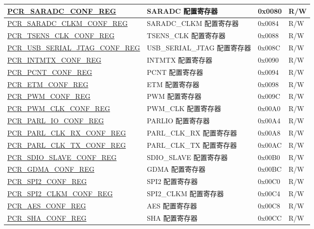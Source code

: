 \begin{longtable}{ | p{6cm} | p{7.2cm} | p{1.3cm} | p{1cm} | }
\hyperref[regdesc:PCRSARADCCONFREG]{PCR\_SARADC\_CONF\_REG} & SARADC 配置寄存器 & 0x0080 & R/W \\ \hline
\hyperref[regdesc:PCRSARADCCLKMCONFREG]{PCR\_SARADC\_CLKM\_CONF\_REG} & SARADC\_CLKM 配置寄存器 & 0x0084 & R/W \\ \hline
\hyperref[regdesc:PCRTSENSCLKCONFREG]{PCR\_TSENS\_CLK\_CONF\_REG} & TSENS\_CLK 配置寄存器 & 0x0088 & R/W \\ \hline
\hyperref[regdesc:PCRUSBDEVICECONFREG]{PCR\_USB\_SERIAL\_JTAG\_CONF\_REG} & USB\_SERIAL\_JTAG 配置寄存器 & 0x008C & R/W \\ \hline
\hyperref[regdesc:PCRINTMTXCONFREG]{PCR\_INTMTX\_CONF\_REG} & INTMTX 配置寄存器 & 0x0090 & R/W \\ \hline
\hyperref[regdesc:PCRPCNTCONFREG]{PCR\_PCNT\_CONF\_REG} & PCNT 配置寄存器 & 0x0094 & R/W \\ \hline
\hyperref[regdesc:PCRETMCONFREG]{PCR\_ETM\_CONF\_REG} & ETM 配置寄存器 & 0x0098 & R/W \\ \hline
\hyperref[regdesc:PCRPWMCONFREG]{PCR\_PWM\_CONF\_REG} & PWM 配置寄存器 & 0x009C & R/W \\ \hline
\hyperref[regdesc:PCRPWMCLKCONFREG]{PCR\_PWM\_CLK\_CONF\_REG} & PWM\_CLK 配置寄存器 & 0x00A0 & R/W \\ \hline
\hyperref[regdesc:PCRPARLIOCONFREG]{PCR\_PARL\_IO\_CONF\_REG} & PARLIO 配置寄存器 & 0x00A4 & R/W \\ \hline
\hyperref[regdesc:PCRPARLCLKRXCONFREG]{PCR\_PARL\_CLK\_RX\_CONF\_REG} & PARL\_CLK\_RX 配置寄存器 & 0x00A8 & R/W \\ \hline
\hyperref[regdesc:PCRPARLCLKTXCONFREG]{PCR\_PARL\_CLK\_TX\_CONF\_REG} & PARL\_CLK\_TX 配置寄存器 & 0x00AC & R/W \\ \hline
\hyperref[regdesc:PCRSDIOSLAVECONFREG]{PCR\_SDIO\_SLAVE\_CONF\_REG} & SDIO\_SLAVE 配置寄存器 & 0x00B0 & R/W \\ \hline
\hyperref[regdesc:PCRGDMACONFREG]{PCR\_GDMA\_CONF\_REG} & GDMA 配置寄存器 & 0x00BC & R/W \\ \hline
\hyperref[regdesc:PCRSPI2CONFREG]{PCR\_SPI2\_CONF\_REG} & SPI2 配置寄存器 & 0x00C0 & R/W \\ \hline
\hyperref[regdesc:PCRSPI2CLKMCONFREG]{PCR\_SPI2\_CLKM\_CONF\_REG} & SPI2\_CLKM 配置寄存器 & 0x00C4 & R/W \\ \hline
\hyperref[regdesc:PCRAESCONFREG]{PCR\_AES\_CONF\_REG} & AES 配置寄存器 & 0x00C8 & R/W \\ \hline
\hyperref[regdesc:PCRSHACONFREG]{PCR\_SHA\_CONF\_REG} & SHA 配置寄存器 & 0x00CC & R/W \\ \hline

\end{longtable}
